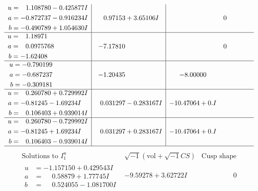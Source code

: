 \documentclass[1p]{elsarticle_modified}
\theoremstyle{definition}
\newcommand{\I}{\sqrt{-1}}
\begin{document}
$$\begin{array}{c|c|c}
\begin{aligned}
u &= \phantom{-}1.108780 - 0.425877 I \\
a &= -0.872737 - 0.916234 I \\
b &= -0.490789 + 1.054630 I\end{aligned}
 & \phantom{-}0.97153 + 3.65106 I & \phantom{-0.000000 } 0 \\ \hline\begin{aligned}
u &= \phantom{-}1.18971\phantom{ +0.000000I} \\
a &= \phantom{-}0.0975768\phantom{ +0.000000I} \\
b &= -1.62408\phantom{ +0.000000I}\end{aligned}
 & -7.17810\phantom{ +0.000000I} & \phantom{-0.000000 } 0 \\ \hline\begin{aligned}
u &= -0.790199\phantom{ +0.000000I} \\
a &= -0.687237\phantom{ +0.000000I} \\
b &= -0.309181\phantom{ +0.000000I}\end{aligned}
 & -1.20435\phantom{ +0.000000I} & -8.00000\phantom{ +0.000000I} \\ \hline\begin{aligned}
u &= \phantom{-}0.260780 + 0.729992 I \\
a &= -0.81245 - 1.69234 I \\
b &= \phantom{-}0.106403 + 0.939014 I\end{aligned}
 & \phantom{-}0.031297 - 0.283167 I & -10.47064 + 0. I\phantom{ +0.000000I} \\ \hline\begin{aligned}
u &= \phantom{-}0.260780 - 0.729992 I \\
a &= -0.81245 + 1.69234 I \\
b &= \phantom{-}0.106403 - 0.939014 I\end{aligned}
 & \phantom{-}0.031297 + 0.283167 I & -10.47064 + 0. I\phantom{ +0.000000I}\\
 \hline 
 \end{array}$$\newpage$$\begin{array}{c|c|c}  
\text{Solutions to }I^u_{1}& \I (\text{vol} + \sqrt{-1}CS) & \text{Cusp shape}\\
 \hline 
\begin{aligned}
u &= -1.157150 + 0.429543 I \\
a &= \phantom{-}0.58879 + 1.77745 I \\
b &= \phantom{-}0.524055 - 1.081700 I\end{aligned}
 & -9.59278 + 3.62722 I & \phantom{-0.000000 } 0 \\ \hline\begin{aligned}

\end{aligned}
\end{array}$$
\end{document}
